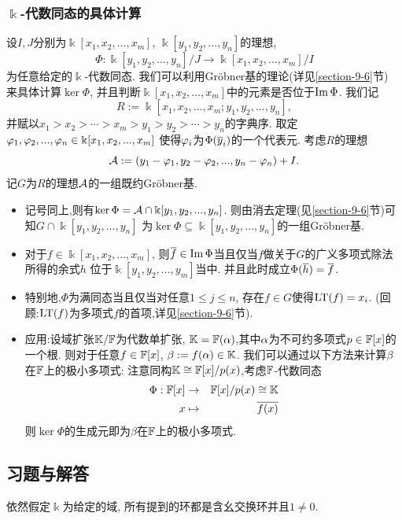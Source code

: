 \documentclass[oneside,a4papar,11pt,UTF8]{book}
\begin{document}
\subsubsection{$\Bbbk$-代数同态的具体计算}

设$I,J$分别为$\Bbbk[x_1,x_2,...,x_m]$,
$\Bbbk[y_1,y_2,...,y_n]$的理想,
\[
  \Phi:\Bbbk[y_1,y_2,...,y_n]/J
  \to
  \Bbbk[x_1,x_2,...,x_m]/I
\]
为任意给定的$\Bbbk$-代数同态.
我们可以利用Gr\"{o}bner基的理论(详见\ref{section-9-6}节)
来具体计算$\ker\Phi$,
并且判断$\Bbbk[x_1,x_2,...,x_m]$中的元素是否位于$\operatorname{Im}\Phi$.
我们记
\[R:=\Bbbk[x_1,x_2,...,x_m; y_1,y_2,...,y_n],\]
并赋以$x_1>x_2>\cdots>x_m>y_1>y_2>\cdots>y_n$的字典序.
取定$\varphi_1,\varphi_2,...,\varphi_n\in\Bbbk[x_1,x_2,...,x_m]$
使得$\varphi_i$为$\Phi(\overline{y}_i)$的一个代表元.
考虑$R$的理想
\[
  \mathcal{A}:=(y_1-\varphi_1,y_2-\varphi_2,...,y_n-\varphi_n)+I.
\]
记$G$为$R$的理想$\mathcal{A}$的一组既约Gr\"{o}bner基.
\begin{itemize}
  \item 记号同上,则有$\ker\Phi=\mathcal{A}\cap\Bbbk[y_1,y_2,...,y_n]$.
  则由消去定理(见\ref{section-9-6}节)可知$G\cap\Bbbk[y_1,y_2,...,y_n]$
  为$\ker\Phi\subseteq\Bbbk[y_1,y_2,...,y_n]$的一组Gr\"{o}bner基.
  \item 对于$f\in\Bbbk[x_1,x_2,...,x_m]$,
  则$\overline{f}\in\operatorname{Im}\Phi$当且仅当$f$做关于$G$的广义多项式除法所得的余式$h$
  位于$\Bbbk[y_1,y_2,...,y_m]$当中.
  并且此时成立$\Phi(\overline{h})=\overline{f}$.
  \item 特别地,$\Phi$为满同态当且仅当对任意$1\leq j\leq n$,
  存在$f\in G$使得$\operatorname{LT}(f)=x_i$.
  (回顾:$\operatorname{LT}(f)$为多项式$f$的首项,详见\ref{section-9-6}节).

  \item 应用:设域扩张$\mathbb{K}/\mathbb{F}$为代数单扩张,
  $\mathbb{K}=\mathbb{F}(\alpha)$,其中$\alpha$为不可约多项式$p\in\mathbb{F}[x]$的一个根.
  则对于任意$f\in\mathbb{F}[x]$, $\beta:=f(\alpha)\in\mathbb{K}$.
  我们可以通过以下方法来计算$\beta$在$\mathbb{F}$上的极小多项式:
  注意同构$\mathbb{K}\cong\mathbb{F}[x]/p(x)$,考虑$\mathbb{F}$-代数同态
  \begin{eqnarray*}
    \Phi:\mathbb{F}[x]&\to&\mathbb{F}[x]/p(x)\cong\mathbb{K}\\
              x&\mapsto&\overline{f(x)}
  \end{eqnarray*}
  则$\ker\Phi$的生成元即为$\beta$在$\mathbb{F}$上的极小多项式.
\end{itemize}

\subsection{习题与解答}

依然假定$\Bbbk$为给定的域,
所有提到的环都是含幺交换环并且$1\neq 0$.
\end{document}
